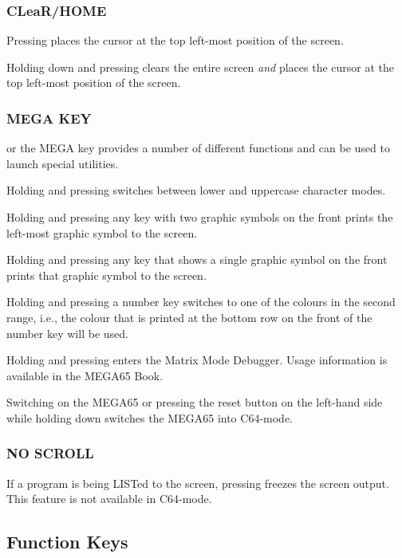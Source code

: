 \subsubsection{CLeaR/HOME}

Pressing  places the cursor at the top left-most position of the screen.

Holding down  and pressing  clears the entire screen {\it and} places the cursor at the top left-most position of the screen.

\subsubsection{MEGA KEY}

\megasymbolkey or the MEGA key provides a number of different functions and can be used to launch special utilities.

Holding  and pressing \megasymbolkey switches between lower and uppercase character modes.

Holding \megasymbolkey and pressing any key with two graphic symbols on the front prints the left-most graphic symbol to the screen.

Holding \megasymbolkey and pressing any key that shows a single graphic symbol on the front prints that graphic symbol to the screen.

Holding \megasymbolkey and pressing a number key switches to one of the colours in the second range, i.e., the colour that is printed at the bottom row on the front of the number key will be used.

Holding \megasymbolkey and pressing  enters the Matrix Mode Debugger. Usage information is available in the MEGA65 Book.

Switching on the MEGA65 or pressing the reset button on the left-hand side while holding down \megasymbolkey switches the MEGA65 into C64-mode.

\subsubsection{NO SCROLL}
If a program is being LISTed to the screen, pressing  freezes the screen output. This feature is not available in C64-mode.


\subsection{Function Keys}

